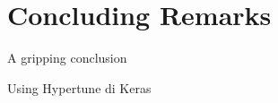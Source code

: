 
\section{Concluding Remarks}
\label{sec:conclusions}

A gripping conclusion

Using Hypertune di Keras
